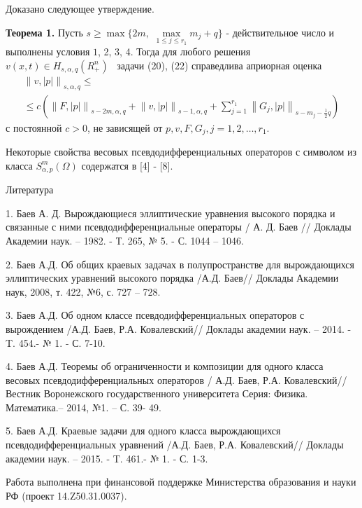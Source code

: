 Доказано следующее утверждение.

\textbf{Теорема 1.} Пусть $s \ge \max \{2m,\,\,\mathop {\max }\limits_{1 \le
j \le r_1 } m_j + q\}$ - действительное число и выполнены условия $1$, 2, 3,
4. Тогда для любого решения $v(x,t) \in H_{s,\alpha ,q} (R_ + ^n )\,\,\,$
задачи (20), (22) справедлива априорная оценка
\begin{multline*}
\left\| {v,\left| p \right|} \right\|_{s,\alpha ,q} \le
\\ \le
c(\left\| {F,\left|
p \right|} \right\|_{s - 2m,\alpha ,q} + \left\| {v,\left| p \right|}
\right\|_{s - 1,\alpha ,q} + \sum\limits_{j = 1}^{r_1 } {\left\| {G_j
,\left| p \right|} \right\|} _{s - m_j - \frac{1}{2}q}
)
\end{multline*}
с постоянной $c > 0$, не зависящей от
$p, v, F, G_j , j = 1,2,\ldots, r_1$.



Некоторые свойства весовых псевдодифференциальных операторов с символом из
класса $S_{\alpha ,p}^m (\Omega )$ содержатся в [4] - [8].

Литература

1. Баев А. Д. Вырождающиеся эллиптические уравнения высокого порядка и
связанные с ними псевдодифференциальные операторы / А. Д. Баев // Доклады
Академии наук. -- 1982. - Т. 265, № 5. - С. 1044 -- 1046.

2. Баев А.Д. Об общих краевых задачах в полупространстве для вырождающихся
эллиптических уравнений высокого порядка /А.Д. Баев// Доклады Академии наук,
2008, т. 422, №6, с. 727 -- 728.

3. Баев А.Д. Об одном классе псевдодифференциальных операторов с вырождением
/А.Д. Баев, Р.А. Ковалевский// Доклады академии наук. -- 2014. - T. 454.- №
1. - С. 7-10.

4. Баев А.Д. Теоремы об ограниченности и композиции для одного класса весовых
псе\-в\-до\-диф\-фе\-ре\-н\-ци\-а\-ль\-ных операторов / А.Д. Баев, Р.А. Ковалевский// Вестник
Воронежского государственного университета Серия: Физика. Математика.--
2014, №1. -- С. 39- 49.

5. Баев А.Д. Краевые задачи для одного класса вырождающихся
псевдодифференциальных уравнений /А.Д. Баев, Р.А. Ковалевский// Доклады
академии наук. -- 2015. - T. 461.- № 1. - С. 1-3.



Работа выполнена при финансовой поддержке Министерства образования и науки
РФ (проект 14.Z50.31.0037).

